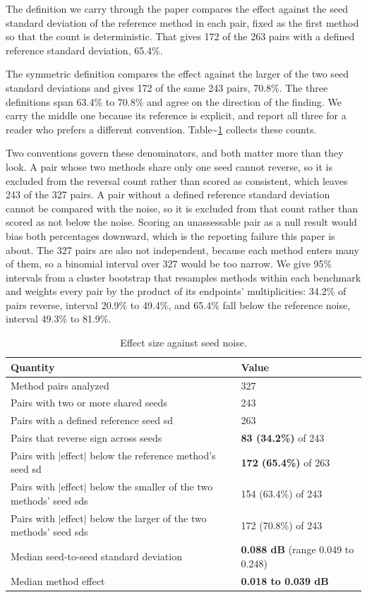 \documentclass[pdflatex,sn-nature]{sn-jnl}
\newlength{\tblavail}
\begin{document}
The definition we carry through the paper compares the effect against the seed standard deviation of the reference method in each pair, fixed as the first method so that the count is deterministic. That gives 172 of the 263 pairs with a defined reference standard deviation, 65.4\%.

The symmetric definition compares the effect against the larger of the two seed standard deviations and gives 172 of the same 243 pairs, 70.8\%. The three definitions span 63.4\% to 70.8\% and agree on the direction of the finding. We carry the middle one because its reference is explicit, and report all three for a reader who prefers a different convention. Table\textasciitilde{}\ref{tab:effect} collects these counts.

Two conventions govern these denominators, and both matter more than they look. A pair whose two methods share only one seed cannot reverse, so it is excluded from the reversal count rather than scored as consistent, which leaves 243 of the 327 pairs. A pair without a defined reference standard deviation cannot be compared with the noise, so it is excluded from that count rather than scored as not below the noise. Scoring an unassessable pair as a null result would bias both percentages downward, which is the reporting failure this paper is about. The 327 pairs are also not independent, because each method enters many of them, so a binomial interval over 327 would be too narrow. We give 95\% intervals from a cluster bootstrap that resamples methods within each benchmark and weights every pair by the product of its endpoints' multiplicities: 34.2\% of pairs reverse, interval 20.9\% to 49.4\%, and 65.4\% fall below the reference noise, interval 49.3\% to 81.9\%.

\begin{table}[htbp]
\centering
\small
\setlength{\tabcolsep}{3pt}
\setlength{\tblavail}{\dimexpr\textwidth-4\tabcolsep\relax}
\begin{tabular}{p{0.640\tblavail}p{0.330\tblavail}}
\hline
Quantity & Value \\
\hline
Method pairs analyzed & 327 \\
Pairs with two or more shared seeds & 243 \\
Pairs with a defined reference seed sd & 263 \\
Pairs that reverse sign across seeds & \textbf{83 (34.2\%)} of 243 \\
Pairs with $|$effect$|$ below the reference method's seed sd & \textbf{172 (65.4\%)} of 263 \\
Pairs with $|$effect$|$ below the smaller of the two methods' seed sds & 154 (63.4\%) of 243 \\
Pairs with $|$effect$|$ below the larger of the two methods' seed sds & 172 (70.8\%) of 243 \\
Median seed-to-seed standard deviation & \textbf{0.088 dB} (range 0.049 to 0.248) \\
Median method effect & \textbf{0.018 to 0.039 dB} \\
\hline
\end{tabular}
\caption{Effect size against seed noise.}\label{tab:effect}
\end{table}
\end{document}

